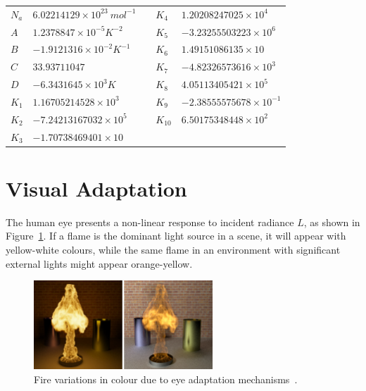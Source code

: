 \begin{table}[htbp!]
\begin{tabular}{|l|l|l|l|l|}
$N_a$ & $6.02214129 \times 10^{23}~mol^{-1}$ &  & $K_4$  & $1.20208247025 \times 10^{4}$   \\ \cline{1-2} \cline{4-5} 
$A$   & $1.2378847 \times 10^{-5} K^{-2}$    &  & $K_5$  & $-3.23255503223 \times 10^{6}$  \\ \cline{1-2} \cline{4-5} 
$B$   & $-1.9121316 \times 10^{-2} K^{-1}$   &  & $K_6$  & $1.49151086135 \times 10$       \\ \cline{1-2} \cline{4-5} 
$C$   & $33.93711047$                        &  & $K_7$  & $-4.82326573616 \times 10^{3}$  \\ \cline{1-2} \cline{4-5} 
$D$   & $-6.3431645 \times 10^3 K$           &  & $K_8$  & $4.05113405421 \times 10^{5}$   \\ \cline{1-2} \cline{4-5} 
$K_1$ & $1.16705214528 \times 10^{3}$        &  & $K_9$  & $-2.38555575678 \times 10^{-1}$ \\ \cline{1-2} \cline{4-5} 
$K_2$ & $-7.24213167032 \times 10^{5}$       &  & $K_{10}$ & $6.50175348448 \times 10^{2}$   \\ \cline{1-2} \cline{4-5} 
$K_3$ & $-1.70738469401 \times 10$           &  &        &                                 \\ \cline{1-2} \cline{4-5}
\end{tabular}
\end{table}
\renewcommand{\arraystretch}{1} %

\FloatBarrier
\section{Visual Adaptation}
\label{sec:visual_adaptation}

The human eye presents a non-linear response to incident radiance $L$, as shown in Figure~\ref{fig:pegoraro_2006_adaptation}.
If a flame is the dominant light source in a scene, it will appear with yellow-white colours, while the same flame in an environment with significant external lights might appear orange-yellow.

\begin{figure}[htbp!]
	\centering
	\includegraphics[width=0.6\textwidth]{img/pegoraro_2006_adaptation}
	\caption{Fire variations in colour due to eye adaptation mechanisms~\cite{Pegoraro:2006}.}
	\label{fig:pegoraro_2006_adaptation}
\end{figure}

